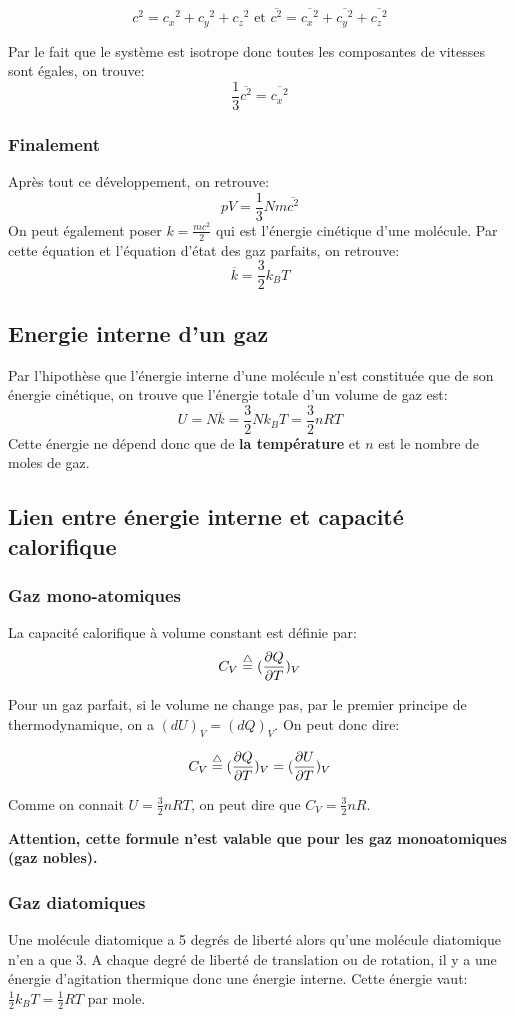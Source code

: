 $$c^2 = {c_x}^2 + {c_y}^2 + {c_z}^2 \textrm{ et }\overline{c^2} = \overline{{c_x}^2} + \overline{{c_y}^2} + \overline{{c_z}^2}$$

Par le fait que le système est isotrope donc toutes les composantes de vitesses sont égales, on trouve: 
$$ \frac{1}{3}\overline{c^2} = \overline{{c_x}^2} $$

\subsubsection{Finalement}
Après tout ce développement, on retrouve:
$$pV = \frac{1}{3}Nm\overline{c^2}$$
On peut également poser $k = \frac{mc^2}{2}$ qui est l'énergie cinétique d'une molécule.
Par cette équation et l'équation d'état des gaz parfaits, on retrouve:
$$\overline{k} = \frac{3}{2}k_B T$$

\subsection{Energie interne d'un gaz}
Par l'hipothèse que l'énergie interne d'une molécule n'est constituée que de son énergie cinétique, on trouve que l'énergie totale d'un volume de gaz est:
$$U = N\overline{k} = \frac{3}{2}Nk_BT = \frac{3}{2}nRT$$
Cette énergie ne dépend donc que de {\bf la température} et $n$ est le nombre de moles de gaz.

\subsection{Lien entre énergie interne et capacité calorifique}
\subsubsection{Gaz mono-atomiques}
La capacité calorifique à volume constant est définie par: 
$$C_V \buildrel\triangle\over = (\frac{\partial Q}{\partial T})_V$$

Pour un gaz parfait, si le volume ne change pas, par le premier principe de thermodynamique, on a $(dU)_V = (dQ)_V$. On peut donc dire:

$$C_V \buildrel\triangle\over = (\frac{\partial Q}{\partial T})_V = (\frac{\partial U}{\partial T})_V$$

Comme on connait $U = \frac{3}{2}nRT$, on peut dire que $C_V = \frac{3}{2}nR$.

{\bf Attention, cette formule n'est valable que pour les gaz monoatomiques (gaz nobles).}

\subsubsection{Gaz diatomiques}
Une molécule diatomique a 5 degrés de liberté alors qu'une molécule diatomique n'en a que 3.
A chaque degré de liberté de translation ou de rotation, il y a une énergie d'agitation thermique donc une énergie interne. Cette énergie vaut: $\frac{1}{2}k_BT = \frac{1}{2}RT$ par mole.

